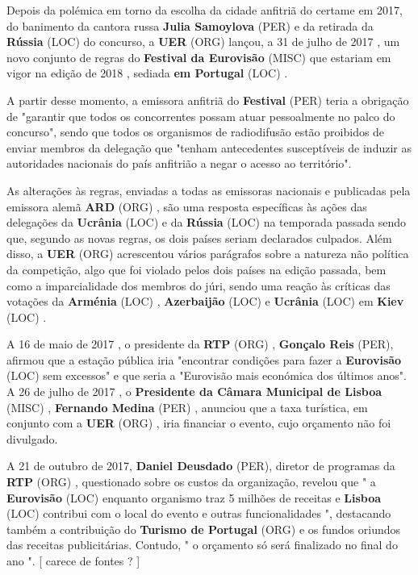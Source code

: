 \documentclass[12pt,a4paper]{article}
\begin{document}
Depois da polémica em torno da escolha da cidade anfitriã do certame em 2017, do banimento da cantora russa \textbf{Julia Samoylova} (PER) e da retirada da \textbf{Rússia} (LOC) do concurso, a \textbf{UER} (ORG) lançou, a 31 de julho de 2017 , um novo conjunto de regras do \textbf{Festival da Eurovisão} (MISC) que estariam em vigor na edição de 2018 , sediada \textbf{em Portugal} (LOC) .

A partir desse momento, a emissora anfitriã do \textbf{Festival} (PER) teria a obrigação de "garantir que todos os concorrentes possam atuar pessoalmente no palco do concurso", sendo que todos os organismos de radiodifusão estão proibidos de enviar membros da delegação que "tenham antecedentes susceptíveis de induzir as autoridades nacionais do país anfitrião a negar o acesso ao território".

As alterações às regras, enviadas a todas as emissoras nacionais e publicadas pela emissora alemã \textbf{ARD} (ORG) , são uma resposta específicas às ações das delegações da \textbf{Ucrânia} (LOC) e da \textbf{Rússia} (LOC) na temporada passada sendo que, segundo as novas regras, os dois países seriam declarados culpados. Além disso, a \textbf{UER} (ORG) acrescentou vários parágrafos sobre a natureza não política da competição, algo que foi violado pelos dois países na edição passada, bem como a imparcialidade dos membros do júri, sendo uma reação às críticas das votações da \textbf{Arménia} (LOC) , \textbf{Azerbaijão} (LOC) e \textbf{Ucrânia} (LOC) em \textbf{Kiev} (LOC) .

A 16 de maio de 2017 , o presidente da \textbf{RTP} (ORG) , \textbf{Gonçalo Reis} (PER), afirmou que a estação pública iria "encontrar condições para fazer a \textbf{Eurovisão} (LOC) sem excessos" e que seria a "Eurovisão mais económica dos últimos anos". A 26 de julho de 2017 , o \textbf{Presidente da Câmara Municipal de Lisboa} (MISC) , \textbf{Fernando Medina} (PER) , anunciou que a taxa turística, em conjunto com a \textbf{UER} (ORG) , iria financiar o evento, cujo orçamento não foi divulgado.

A 21 de outubro de 2017, \textbf{Daniel Deusdado} (PER), diretor de programas da \textbf{RTP} (ORG) , questionado sobre os custos da organização, revelou que " a \textbf{Eurovisão} (LOC) enquanto organismo traz 5 milhões de receitas e \textbf{Lisboa} (LOC) contribui com o local do evento e outras funcionalidades ", destacando também a contribuição do \textbf{Turismo de Portugal} (ORG) e os fundos oriundos das receitas publicitárias. Contudo, " o orçamento só será finalizado no final do ano ". [ carece de fontes ? ]
\end{document}
